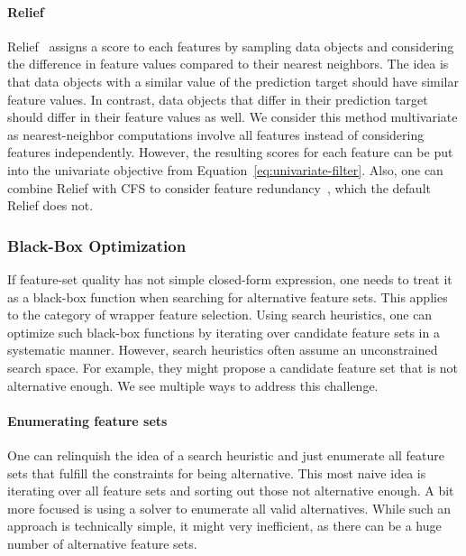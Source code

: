 \documentclass{article}
\theoremstyle{definition}
\begin{document}
\paragraph{Relief}

Relief~\cite{kira1992feature} assigns a score to each features by sampling data objects and considering the difference in feature values compared to their nearest neighbors.
The idea is that data objects with a similar value of the prediction target should have similar feature values.
In contrast, data objects that differ in their prediction target should differ in their feature values as well.
We consider this method multivariate as nearest-neighbor computations involve all features instead of considering features independently.
However, the resulting scores for each feature can be put into the univariate objective from Equation~\ref{eq:univariate-filter}.
Also, one can combine Relief with CFS to consider feature redundancy~\cite{hall1999correlation}, which the default Relief does not.

\subsubsection{Black-Box Optimization}
\label{sec:approach:objectives:black-box}

If feature-set quality has not simple closed-form expression, one needs to treat it as a black-box function when searching for alternative feature sets.
This applies to the category of wrapper feature selection.
Using search heuristics, one can optimize such black-box functions by iterating over candidate feature sets in a systematic manner.
However, search heuristics often assume an unconstrained search space.
For example, they might propose a candidate feature set that is not alternative enough.
We see multiple ways to address this challenge.

\paragraph{Enumerating feature sets}

One can relinquish the idea of a search heuristic and just enumerate all feature sets that fulfill the constraints for being alternative.
This most naive idea is iterating over all feature sets and sorting out those not alternative enough.
A bit more focused is using a solver to enumerate all valid alternatives.
While such an approach is technically simple, it might very inefficient, as there can be a huge number of alternative feature sets.
\end{document}
